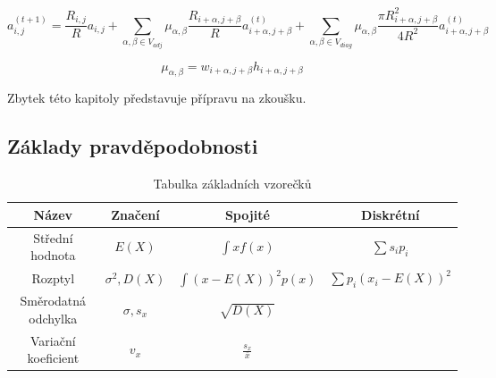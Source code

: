 \documentclass[11pt,a4paper]{scrartcl}
\begin{document}
	\begin{equation}
	a_{i,j}^{(t+1)} = \frac{R_{i,j}}{R}a_{i,j} + 
	\sum_{\alpha,\beta \in V_{adj}} \mu_{\alpha,\beta} \frac{R_{i + \alpha, j+\beta}}{R} a_{i + \alpha, j + \beta} ^{(t)} + 
	\sum_{\alpha,\beta \in V_{diag}} \mu_{\alpha,\beta} \frac{\pi R_{i + \alpha, j+\beta} ^2}{4R^2} a_{i + \alpha, j + \beta} ^{(t)}	
	\label{eq:fire-spread-eq}
	\end{equation}
	
	\begin{equation}
		\mu_{\alpha,\beta} = w_{i+\alpha, j+\beta} h_{i+\alpha, j+\beta}
		\label{eq:mu}
	\end{equation}
	
	Zbytek této kapitoly představuje přípravu na zkoušku.
	
	\subsection{Základy pravděpodobnosti}
	\begin{table}[H]
		\centering
		\begin{tabular}{|c|c|c|c|}
			\hline
			Název & Značení & Spojité & Diskrétní \\
			\hline
			\hline
			Střední hodnota & $E(X)$ & $\int{xf(x)}$ & $\sum s_ip_i$ \\
			\hline
			Rozptyl & $\sigma^2, D(X)$ & $\int{(x-E(X))^2p(x)}$& $\sum p_i(x_i - E(X))^2$ \\
			\hline
			Směrodatná odchylka & $\sigma, s_x$ & $\sqrt{D(X)}$ & \\
			\hline
			Variační koeficient & $v_x$ & $\frac{s_x}{\bar{x}}$ & \\
			\hline
		\end{tabular}
		\caption{Tabulka základních vzorečků}
	\end{table}
\end{document}
